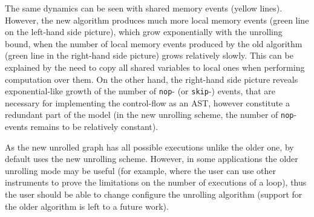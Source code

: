 The same dynamics can be seen with shared memory events (yellow lines).
However, the new algorithm produces much more local memory events (green line on the left-hand side picture), which grow exponentially with the unrolling bound, when the number of local memory events produced by the old algorithm (green line in the right-hand side picture) grows relatively slowly.
This can be explained by the need to copy all shared variables to local ones when performing computation over them.
On the other hand, the right-hand side picture reveals exponential-like growth of the number of \texttt{nop}- (or \texttt{skip}-) events, that are necessary for implementing the control-flow as an AST, however constitute a redundant part of the model (in the new unrolling scheme, the number of \texttt{nop}-events remains to be relatively constant).

As the new unrolled graph has all possible executions unlike the older one, by default \porthos[2] uses the new unrolling scheme.
However, in some applications the older unrolling mode may be useful (for example, where the user can use other instruments to prove the limitations on the number of executions of a loop), thus the user should be able to change configure the unrolling algorithm (support for the older algorithm is left to a future work).



